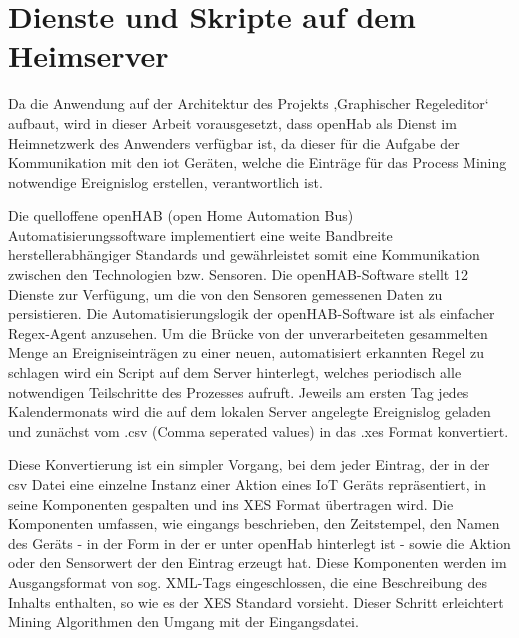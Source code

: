 \section{Dienste und Skripte auf dem Heimserver}
Da die Anwendung auf der Architektur des Projekts ‚Graphischer Regeleditor‘ aufbaut, wird in dieser Arbeit vorausgesetzt, dass openHab als Dienst im Heimnetzwerk des Anwenders verfügbar ist, da dieser für die Aufgabe der Kommunikation mit den iot Geräten, welche die Einträge für das Process Mining notwendige Ereignislog erstellen, verantwortlich ist. 

Die quelloffene openHAB (open Home Automation Bus) Automatisierungssoftware implementiert eine weite Bandbreite herstellerabhängiger Standards und gewährleistet somit eine Kommunikation zwischen den Technologien bzw. Sensoren. Die openHAB-Software stellt 12 Dienste zur Verfügung, um die von den Sensoren gemessenen Daten zu persistieren. Die Automatisierungslogik der openHAB-Software ist als einfacher Regex-Agent anzusehen. 
Um die Brücke von der unverarbeiteten gesammelten Menge an Ereigniseinträgen zu einer neuen, automatisiert erkannten Regel zu schlagen wird ein Script auf dem Server hinterlegt, welches periodisch alle notwendigen Teilschritte des Prozesses aufruft. Jeweils am ersten Tag jedes Kalendermonats wird die auf dem lokalen Server angelegte Ereignislog geladen und zunächst vom .csv (Comma seperated values) in das .xes Format konvertiert. 

Diese Konvertierung ist ein simpler Vorgang, bei dem jeder Eintrag, der in der csv Datei eine einzelne Instanz einer Aktion eines IoT Geräts repräsentiert, in seine Komponenten gespalten und ins XES Format übertragen wird. Die Komponenten umfassen, wie eingangs beschrieben, den Zeitstempel, den Namen des Geräts - in der Form in der er unter openHab hinterlegt ist - sowie die Aktion oder den Sensorwert der den Eintrag erzeugt hat. Diese Komponenten werden im Ausgangsformat von sog. XML-Tags eingeschlossen, die eine Beschreibung des Inhalts enthalten, so wie es der XES Standard vorsieht. Dieser Schritt erleichtert Mining Algorithmen den Umgang mit der Eingangsdatei. 


